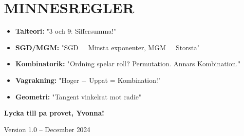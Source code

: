 \documentclass[11pt,a4paper]{article}
\begin{document}
\section{MINNESREGLER}

\begin{itemize}
\item \textbf{Talteori:} "3 och 9: Siffersumma!"
\item \textbf{SGD/MGM:} "SGD = Minsta exponenter, MGM = Storsta"
\item \textbf{Kombinatorik:} "Ordning spelar roll? Permutation. Annars Kombination."
\item \textbf{Vagrakning:} "Hoger + Uppat = Kombination!"
\item \textbf{Geometri:} "Tangent vinkelrat mot radie"
\end{itemize}

\vfill
\begin{center}
\textbf{\Large Lycka till pa provet, Yvonna!}

Version 1.0 -- December 2024
\end{center}
\end{document}
